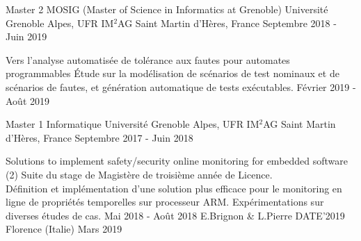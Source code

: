 


\begin{cventries}



\cventry
{Master 2 MOSIG (Master of Science in Informatics at Grenoble)} %
{Université Grenoble Alpes, UFR IM$^2$AG} %
{Saint Martin d'Hères, France} %
{Septembre 2018 - Juin 2019} %
{}

%
{}%
{}%
{}%
{
  \begin{cvdescription}
    {Vers l'analyse automatisée de tolérance aux fautes pour automates
      programmables}%
    {Étude sur la modélisation de scénarios de test nominaux et de
      scénarios de fautes, et génération automatique de tests
      exécutables.}%
    {Février 2019 - Août 2019}
  \end{cvdescription}
}

\vspace{-.5cm}

\vspace{-.2cm}

\cventry
{Master 1 Informatique} %
{Université Grenoble Alpes, UFR IM$^2$AG} %
{Saint Martin d'Hères, France} %
{Septembre 2017 - Juin 2018} %
{}

%
{}%
{}%
{}%
{
  \begin{cvdescription}
    {Solutions to implement safety/security online monitoring for
      embedded software (2)}%
    {Suite du stage de Magistère de troisième année de Licence.\\
      Définition et implémentation d'une solution plus efficace pour
      le monitoring en ligne de propriétés temporelles sur processeur
      ARM. Expérimentations sur diverses études de cas.}%
    {Mai 2018 - Août 2018} %
    {E.Brignon \& L.Pierre}%
    {DATE'2019}%
    {Florence (Italie)}%
    {Mars 2019}
  \end{cvdescription}
}


\end{cventries}
